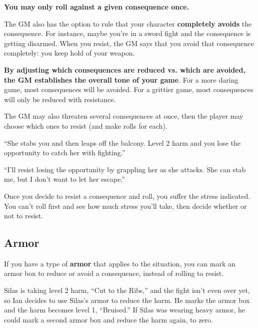 \textbf{You may only roll against a given consequence once.}

The GM also has the option to rule that your character \textbf{completely avoids} the consequence. For instance, maybe you’re in a sword fight and the consequence is getting disarmed. When you resist, the GM says that you avoid that consequence completely: you keep hold of your weapon.

\textbf{By adjusting which consequences are reduced vs. which are avoided, the GM establishes the overall tone of your game}. For a more daring game, most consequences will be avoided. For a grittier game, most consequences will only be reduced with resistance.

The GM may also threaten several consequences at once, then the player may choose which ones to resist (and make rolls for each).

\begin{qb}
``She stabs you and then leaps off the balcony. Level 2 harm and you lose the opportunity to catch her with fighting.''

``I’ll resist losing the opportunity by grappling her as she attacks. She can stab me, but I don’t want to let her escape.''
\end{qb}

Once you decide to resist a consequence and roll, you suffer the stress indicated. You can’t roll first and see how much stress you’ll take, then decide whether or not to resist.


\subsection{Armor}

If you have a type of \textbf{armor} that applies to the situation, you can mark an armor box to reduce or avoid a consequence, instead of rolling to resist.

\begin{qb}Silas is taking level 2 harm, ``Cut to the Ribs,'' and the fight isn’t even over yet, so Ian decides to use Silas’s armor to reduce the harm. He marks the armor box and the harm becomes level 1, ``Bruised.'' If Silas was wearing heavy armor, he could mark a second armor box and reduce the harm again, to zero.\end{qb}

